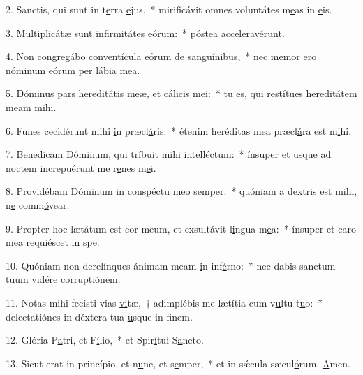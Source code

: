 2. Sanctis, qui sunt in t\uline{e}rra \uline{e}jus,~* mirificávit omnes voluntátes m\uline{e}as in \uline{e}is.\par 
3. Multiplicátæ sunt infirmit\uline{á}tes e\uline{ó}rum:~* póstea accel\uline{e}rav\uline{é}runt.\par 
4. Non congregábo conventícula eórum d\uline{e} san\uline{guí}nibus,~* nec memor ero nóminum eórum per l\uline{á}bia m\uline{e}a.\par 
5. Dóminus pars hereditátis meæ, et c\uline{á}licis m\uline{e}i:~* tu es, qui restítues hereditátem m\uline{e}am m\uline{i}hi.\par 
6. Funes cecidérunt mihi \uline{i}n præcl\uline{á}ris:~* étenim heréditas mea præcl\uline{á}ra est m\uline{i}hi.\par 
7. Benedícam Dóminum, qui tríbuit mihi \uline{i}ntell\uline{é}ctum:~* ínsuper et usque ad noctem increpuérunt me r\uline{e}nes m\uline{e}i.\par 
8. Providébam Dóminum in conspéctu m\uline{e}o s\uline{e}mper:~* quóniam a dextris est mihi, n\uline{e} comm\uline{ó}vear.\par 
9. Propter hoc lætátum est cor meum, et exsultávit l\uline{i}ngua m\uline{e}a:~* ínsuper et caro mea requi\uline{é}scet \uline{i}n spe.\par 
10. Quóniam non derelínques ánimam meam \uline{i}n inf\uline{é}rno:~* nec dabis sanctum tuum vidére corr\uline{u}pti\uline{ó}nem.\par 
11. Notas mihi fecísti vias \uline{vi}tæ,~† adimplébis me lætítia cum v\uline{u}ltu t\uline{u}o:~* delectatiónes in déxtera tua \uline{u}sque in f\uline{i}nem.\par 
12. Glória P\uline{a}tri, et F\uline{í}lio,~* et Spir\uline{í}tui S\uline{a}ncto.\par 
13. Sicut erat in princípio, et n\uline{u}nc, et s\uline{e}mper,~* et in sǽcula sæcul\uline{ó}rum. \uline{A}men.\par 
